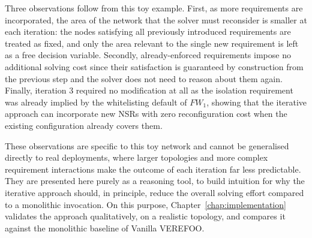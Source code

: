 Three observations follow from this toy example. First, as more requirements are incorporated, the area of the network that the solver must reconsider is smaller at each iteration: the nodes satisfying all previously introduced requirements are treated as fixed, and only the area relevant to the single new requirement is left as a free decision variable. Secondly, already-enforced requirements impose no additional solving cost since their satisfaction is guaranteed by construction from the previous step and the solver does not need to reason about them again. Finally, iteration 3 required no modification at all as the isolation requirement was already implied by the whitelisting default of $\mathit{FW}_1$, showing that the iterative approach can incorporate new NSRs with zero reconfiguration cost when the existing configuration already covers them.

These observations are specific to this toy network and cannot be generalised directly to real deployments, where larger topologies and more complex requirement interactions make the outcome of each iteration far less predictable. They are presented here purely as a reasoning tool, to build intuition for why the iterative approach should, in principle, reduce the overall solving effort compared to a monolithic invocation. On this purpose, Chapter~\ref{chap:implementation} validates the approach qualitatively, on a realistic topology, and compares it against the monolithic baseline of Vanilla VEREFOO.

